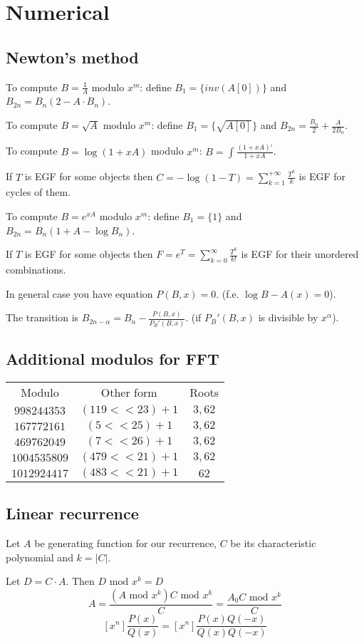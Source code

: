 \chapter{Numerical}
\section{Newton's method}
	To compute $B = \frac{1}{A}$ modulo $x^m$: define $B_1 = \{inv(A[0])\}$ and $B_{2n} = B_n (2 - A \cdot B_n)$.


	To compute $B = \sqrt{A}$ modulo $x^m$: define $B_1 = \{\sqrt{A[0]}\}$ and $B_{2n} = \frac{B_n}{2} + \frac{A}{2B_n}$.


	To compute $B = \log (1 + xA)$ modulo $x^m$: $B = \int\frac{(1 + xA)'}{1 + xA}$.

	If $T$ is EGF for some objects then $C = -\log (1 - T) = \sum_{k = 1}^{+\infty} \frac{T^k}{k}$ is EGF for cycles of them.


	To compute $B = e^{xA}$ modulo $x^m$: define $B_1 = \{1\}$ and $B_{2n} = B_n(1 + A - \log B_n)$.

	If $T$ is EGF for some objects then $F = e^T = \sum_{k = 0}^{\infty} \frac{T^k}{k!}$ is EGF for their unordered combinations.

	In general case you have equation $P(B, x) = 0$. (f.e. $\log B - A(x) = 0$).

	The transition is $B_{2n - \alpha} = B_n - \frac{P(B, x)}{P_B'(B, x)}$. (if $P_B'(B, x)$ is divisible by $x^\alpha$).
\section{Additional modulos for FFT}
\begin{center}
	\begin{tabular}{ c | c | c }
		Modulo & Other form & Roots \\
		$998244353$ & $(119 << 23) + 1$ & $3, 62$ \\
		$167772161$ & $(5 << 25) + 1$ & $3, 62$ \\
		$469762049$ & $(7 << 26) + 1$ & $3, 62$ \\
		$1004535809$ & $(479 << 21) + 1$ & $3, 62$ \\
		$1012924417$ & $(483 << 21) + 1$ & $62$ \\

	\end{tabular}
\end{center}

\section{Linear recurrence}
Let $A$ be generating function for our recurrence, $C$ be its characteristic polynomial and $k = |C|$.

Let $D = C \cdot A$. Then $D \text{ mod } x^k = D$
$$A = \frac{(A \text{ mod } x^k) C \text{ mod } x^k}{C} = \frac{A_0C \text{ mod } x^k}{C}$$
$$[x^n]\frac{P(x)}{Q(x)} = [x^n]\frac{P(x)Q(-x)}{Q(x)Q(-x)}$$
